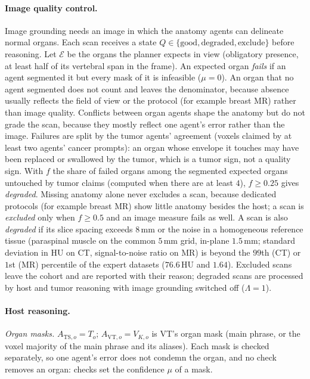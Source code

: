 \documentclass[fleqn,10pt]{olplainarticle}
\begin{document}
\paragraph{Image quality control.}
\label{sec:qc_details}
Image grounding needs an image in which the anatomy agents can delineate normal organs. Each scan receives a state
$Q\in\{\text{good},\text{degraded},\text{exclude}\}$ before reasoning. Let $\mathcal{E}$ be the organs the planner expects in
view (obligatory presence, at least half of its vertebral span in the frame). An expected organ \emph{fails} if an agent
segmented it but every mask of it is infeasible ($\mu=0$). An organ that no agent segmented does not count and leaves the
denominator, because absence usually reflects the field of view or the protocol (for example breast MR) rather than image
quality. Conflicts between organ agents shape the anatomy but do not grade the scan, because they mostly reflect one
agent's error rather than the image. Failures are split by the tumor agents' agreement (voxels claimed by at
least two agents' cancer prompts): an organ whose envelope it touches may have been replaced or swallowed by the tumor,
which is a tumor sign, not a quality sign. With $f$ the share of failed organs among the
segmented expected organs untouched by tumor claims (computed when there are at least $4$), $f\ge0.25$ gives \emph{degraded}. Missing
anatomy alone never excludes a scan, because dedicated protocols (for example breast MR) show little anatomy besides the
host; a scan is \emph{excluded} only when $f\ge0.5$ and an image measure fails as well. A scan is also \emph{degraded} if its slice spacing exceeds $8$\,mm or the noise in a
homogeneous reference tissue (paraspinal muscle on the common $5$\,mm grid, in-plane $1.5$\,mm; standard deviation in HU on
CT, signal-to-noise ratio on MR) is beyond the $99$th (CT) or $1$st (MR) percentile of the expert datasets
($76.6$\,HU and $1.64$). Excluded scans leave the cohort and are reported with their reason; degraded scans
are processed by host and tumor reasoning with image grounding switched off ($\Lambda=1$).

\paragraph{Host reasoning.}
\label{sec:host_details}
\emph{Organ masks.} $A_{\mathrm{TS},o}=T_o$; $A_{\mathrm{VT},o}=V_{K,o}$ is VT's organ mask (main phrase, or the voxel
majority of the main phrase and its aliases). Each mask is checked separately, so one agent's error does not condemn the
organ, and no check removes an organ: checks set the confidence $\mu$ of a mask.
\end{document}
